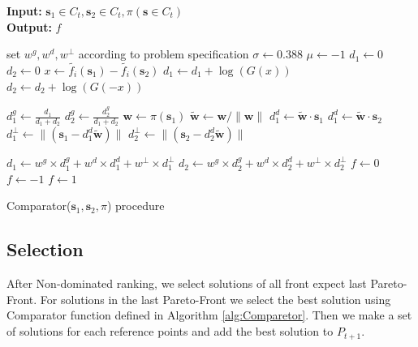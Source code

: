 \documentclass[letterpaper, 10 pt, conference]{ieeeconf}  %
\begin{document}
\begin{algorithm}[!ht]
	
 	\textbf{Input:} $\textbf{s}_1 \in C_t,\textbf{s}
_2 \in C_t,\pi(\textbf{s} \in C_t)$\\
 	\textbf{Output:} $f$
	
 	\begin{algorithmic}[1]
    \State set $w^g,w^d,w^{\perp}$ according to problem specification
    \State $\sigma \gets 0.388$
    \State $\mu \gets -1$
    \State $d_1 \gets 0$
    \State $d_2 \gets 0$
    \State $x \gets \tilde{f_i}(\mathbf{s}_1)-\tilde{f_i}(\mathbf{s}_2) $
    \State $d_1 \gets d_1+\log(G(x))$
     \State $d_2 \gets d_2+\log(G(-x))$
    
    \EndFor
    \State $d_{1}^g \gets \frac{d_1} {d_1+d_2}$
    \State $d_{2}^g \gets \frac{d_{2}^g} {d_1+d_2}$
    \State $\mathbf{w} \gets \pi(\mathbf{s}_1)$
    \State $\mathbf{\tilde{w}} \gets \mathbf{w} / \parallel \mathbf{w} \parallel$
    \State $d_{1}^d \gets \mathbf{\tilde{w}} \cdot \mathbf{s}_1$
    \State $d_{1}^d \gets \mathbf{\tilde{w}} \cdot \mathbf{s}_2$
    \State $d^{\perp}_1 \gets \parallel(\mathbf{s}_1-d_1^d \mathbf{\tilde{w}}) \parallel $
        \State $d^{\perp}_2 \gets \parallel(\mathbf{s}_2-d_2^d \mathbf{\tilde{w}}) \parallel $
        
        \State $d_1 \gets w^g\times d^{g}_1+ w^d \times d^{d}_1 + w^{\perp} \times d^{\perp}_1 $
        \State $d_2 \gets w^g\times d^{g}_2+ w^d \times d^{d}_2 + w^{\perp} \times d^{\perp}_2 $
         \State $f \gets 0$
    \State $f \gets -1$
    \EndIf
     \State $f \gets 1$
    \EndIf
   
    
    
		
	\end{algorithmic} 
	
	\caption{Comparator($\textbf{s}_1,\textbf{s}_2,\pi$) procedure}
	
 	\label{alg:Comparetor}
 \end{algorithm}





\subsection{Selection}
After Non-dominated ranking, we select solutions of all front expect last Pareto-Front. For solutions in the last Pareto-Front we select the best solution using Comparator function defined in Algorithm \ref{alg:Comparetor}. 
Then we make a set of solutions for each reference points and add the best solution to $P_{t+1} $.
  
\end{document}
